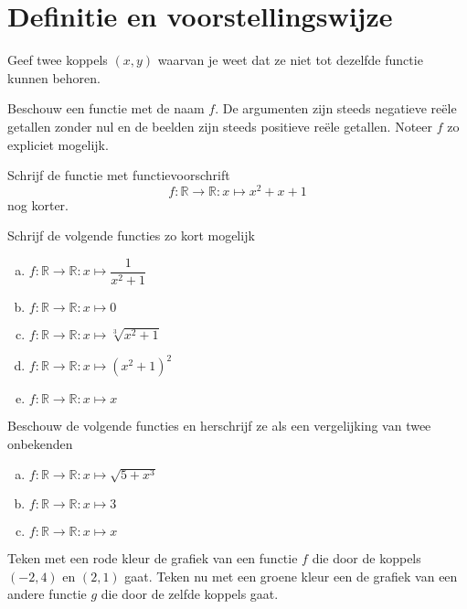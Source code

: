 \documentclass[12pt,twoside]{article}
\begin{document}
\section{Definitie en voorstellingswijze}

\begin{oefening}
Geef twee koppels $(x,y)$ waarvan je weet dat ze niet tot dezelfde functie kunnen behoren.
\end{oefening}

\begin{oefening}
Beschouw een functie met de naam $f$. De argumenten zijn steeds negatieve reële getallen zonder nul en de beelden zijn steeds positieve reële getallen. Noteer $f$ zo expliciet mogelijk.
\end{oefening}

\begin{oefening}
Schrijf de functie met functievoorschrift
$$f:\mathbb{R}\to\mathbb{R}:x\mapsto x^2+x+1$$
nog korter.
\end{oefening}

\begin{oefening}
Schrijf de volgende functies zo kort mogelijk
\begin{enumerate}[(a)]
  \item $f:\mathbb{R}\to\mathbb{R}:x\mapsto \dfrac{1}{x^2+1}$
  \item $f:\mathbb{R}\to\mathbb{R}:x\mapsto 0$
  \item $f:\mathbb{R}\to\mathbb{R}:x\mapsto \sqrt[3]{x^2+1}$
  \item $f:\mathbb{R}\to\mathbb{R}:x\mapsto \left(x^2+1\right)^2$
  \item $f:\mathbb{R}\to\mathbb{R}:x\mapsto x$
\end{enumerate}
\end{oefening}

\begin{oefening}
Beschouw de volgende functies en herschrijf ze als een vergelijking van twee onbekenden
\begin{enumerate}[(a)]
  \item $f:\mathbb{R}\to\mathbb{R}:x\mapsto \sqrt{5+x^3}$
  \item $f:\mathbb{R}\to\mathbb{R}:x\mapsto 3$
  \item $f:\mathbb{R}\to\mathbb{R}:x\mapsto x$
\end{enumerate}
\end{oefening}

\begin{oefening}
Teken met een rode kleur de grafiek van een functie $f$ die door de koppels $(-2, 4)$ en $(2,1)$ gaat. Teken nu met een groene kleur een de grafiek van een andere functie $g$ die door de zelfde koppels gaat.
\end{oefening}
\end{document}
